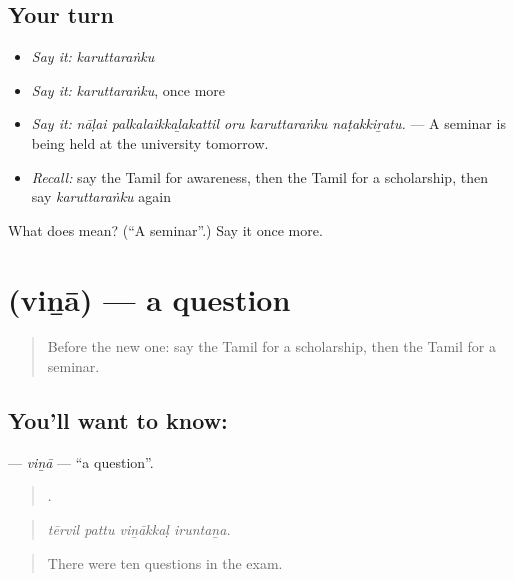 \subsection*{Your turn}
\begin{itemize}
\raggedright
  \item \emph{Say it:} \emph{karuttaraṅku}
  \item \emph{Say it:} \emph{karuttaraṅku}, once more
  \item \emph{Say it:} \emph{nāḷai palkalaikkaḻakattil oru karuttaraṅku naṭakkiṟatu.} — A seminar is being held at the university tomorrow.
  \item \emph{Recall:} say the Tamil for awareness, then the Tamil for a scholarship, then say \emph{karuttaraṅku} again
\end{itemize}

\begin{tcolorbox}[breakable,colback=teal!4,colframe=teal!35!black,title={Before you move on}]
What does  mean? (\textquotedblleft{}A seminar\textquotedblright{}.) Say it once more.
\end{tcolorbox}
\section[\texorpdfstring{\ta{வினா} (viṉā)}{வினா (viṉā)}]{ (viṉā) — a question}

\label{lesson:TA-C368-vina}



\begin{quote}
Before the new one: say the Tamil for a scholarship, then the Tamil for a seminar.
\end{quote}

\subsection*{You'll want to know: }
\textbf{} — \emph{viṉā} — \textquotedblleft{}a question\textquotedblright{}.

\begin{quote}
   .
\end{quote}

\begin{quote}
\emph{tērvil pattu viṉākkaḷ iruntaṉa.}
\end{quote}

\begin{quote}
There were ten questions in the exam.
\end{quote}

